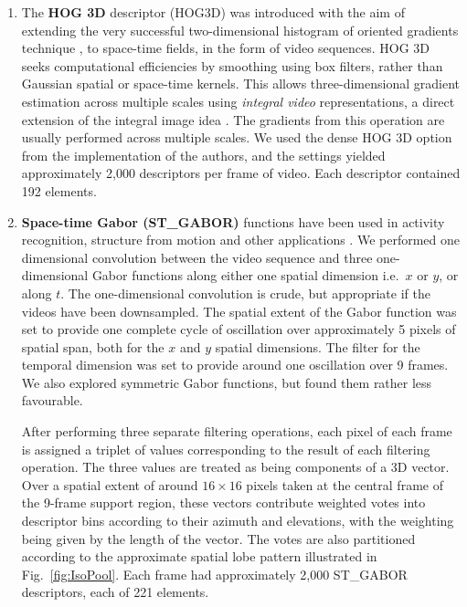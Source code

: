 \begin{enumerate}
\item The \textbf{HOG 3D} descriptor (HOG3D) \citep{Klaser2008} was introduced with the aim of extending the very successful two-dimensional histogram of oriented gradients technique \citep{Dalal}, to space-time fields, in the form of video sequences.  HOG 3D seeks computational efficiencies by smoothing using box filters, rather than Gaussian spatial or space-time kernels.  This allows three-dimensional gradient estimation across multiple scales using {\em integral video} representations, a direct extension of the integral image idea \citep{Viola2001}.  The gradients from this operation are usually performed across multiple scales.  We used the dense HOG 3D option from the implementation of the authors, and the settings yielded approximately 2,000  descriptors per frame of video. Each descriptor contained 192 elements.

\item \textbf{Space-time Gabor (ST\_GABOR)} functions have been used in activity recognition, structure from motion and other applications \cite{Bregonzio2009}.  We performed one dimensional convolution between the video sequence and three one-dimensional Gabor functions along either one spatial dimension i.e.\ $x$ or $y$, or along $t$.  The one-dimensional convolution  is crude, but appropriate if the videos have been downsampled. The spatial extent of the Gabor function was set to provide one complete cycle of oscillation over approximately 5 pixels of spatial span, both for the $x$ and $y$ spatial dimensions. The filter for the temporal dimension was set to provide  around one oscillation over 9 frames.  We also explored symmetric Gabor functions, but found them rather less favourable.

After performing three separate filtering operations, each pixel of each frame is assigned a triplet of values corresponding to the result of each filtering operation.  The three values are treated as being components of a 3D vector.  Over a spatial extent of around $16 \times 16$ pixels taken at the central frame of the 9-frame support region, these vectors contribute weighted votes into descriptor bins according to their azimuth and elevations, with the weighting being given by the length of the vector.  The votes are also partitioned according to the approximate spatial lobe pattern illustrated in Fig.~\ref{fig:IsoPool}. Each frame had approximately 2,000 ST\_GABOR descriptors, each of 221 elements.



\end{enumerate}
